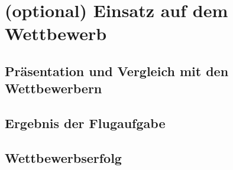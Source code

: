 \chapter{(optional) Einsatz auf dem Wettbewerb}\label{cha:Einsatz auf dem Wettbewerb}

\section{Präsentation und Vergleich mit den Wettbewerbern}

\section{Ergebnis der Flugaufgabe}

\section{Wettbewerbserfolg}

